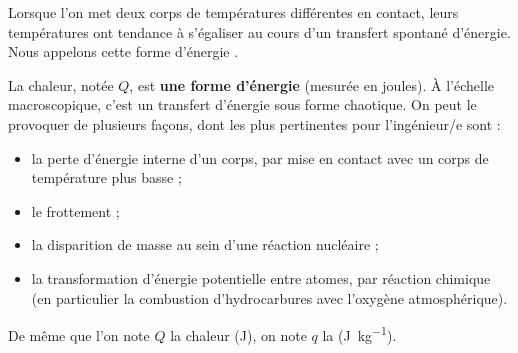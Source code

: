 		Lorsque l’on met deux corps de températures différentes en contact, leurs températures ont tendance à s’égaliser au cours d’un transfert spontané d’énergie. Nous appelons cette forme d’énergie .

		La chaleur, notée $Q$, est \textbf{une forme d’énergie} (mesurée en \si{joules}). À l’échelle macroscopique, c’est un transfert d’énergie sous forme chaotique. On peut le provoquer de plusieurs façons, dont les plus pertinentes pour l’ingénieur/e sont :

		\begin{itemize}
		
			\item la perte d’énergie interne d’un corps, par mise en contact avec un corps de température plus basse ;
		\onlyframabook{\end{itemize}\par\vspace{-1em}\begin{itemize}}%

			\item le frottement ;
			
			\item la disparition de masse au sein d’une réaction nucléaire ;
			
			\item la transformation d’énergie potentielle entre atomes, par réaction chimique (en particulier la combustion d’hydrocarbures avec l’oxygène atmosphérique).

		\end{itemize}
		
		De même que l’on note $Q$ la chaleur (\si{\joule}), on note $q$ la  (\si{\joule\per\kilogram}).
		
